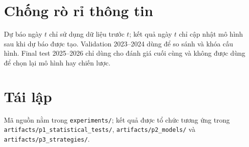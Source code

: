\section{Chống rò rỉ thông tin}
Dự báo ngày $t$ chỉ sử dụng dữ liệu trước $t$; kết quả ngày $t$ chỉ cập nhật mô hình sau khi dự báo được tạo. Validation 2023--2024 dùng để so sánh và khóa cấu hình. Final test 2025--2026 chỉ dùng cho đánh giá cuối cùng và không được dùng để chọn lại mô hình hay chiến lược.

\section{Tái lập}
Mã nguồn nằm trong \texttt{experiments/}; kết quả được tổ chức tương ứng trong \texttt{artifacts/p1\_statistical\_tests/}, \texttt{artifacts/p2\_models/} và \texttt{artifacts/p3\_strategies/}.
